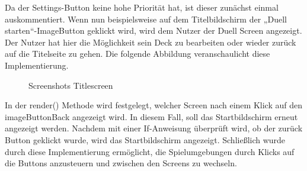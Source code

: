 Da der Settings-Button keine hohe Priorität hat, ist dieser zunächst einmal auskommentiert.
Wenn nun beispielsweise auf dem Titelbildschirm der „Duell starten“-ImageButton geklickt wird, wird dem Nutzer der Duell Screen angezeigt.
Der Nutzer hat hier die Möglichkeit sein Deck zu bearbeiten oder wieder zurück auf die Titelseite zu gehen. Die folgende Abbildung veranschaulicht diese Implementierung. 

\begin{figure}[h]
\centering
\qquad
\caption{Screenshots Titlescreen}%
 \label{fig:Screenshots Titlescreen}%
\end{figure}

In der render() Methode wird festgelegt, welcher Screen nach einem Klick auf den imageButtonBack angezeigt wird. In diesem Fall, soll das Startbildschirm erneut angezeigt werden. Nachdem mit einer If-Anweisung überprüft wird, ob der zurück Button geklickt wurde, wird das Startbildschirm angezeigt.  
Schließlich wurde durch diese Implementierung ermöglicht, die Spielumgebungen durch Klicks auf die Buttons anzusteuern und zwischen den Screens zu wechseln. 

